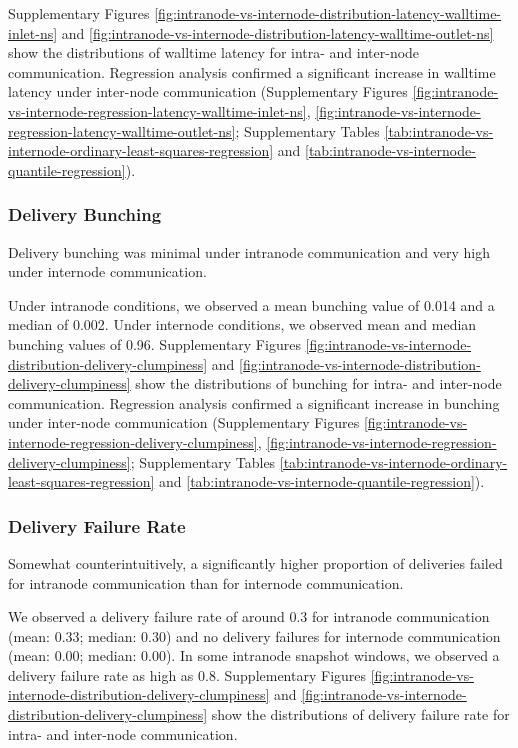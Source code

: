 Supplementary Figures \ref{fig:intranode-vs-internode-distribution-latency-walltime-inlet-ns} and \ref{fig:intranode-vs-internode-distribution-latency-walltime-outlet-ns} show the distributions of walltime latency for intra- and inter-node communication.
Regression analysis confirmed a significant increase in walltime latency under inter-node communication (Supplementary Figures \ref{fig:intranode-vs-internode-regression-latency-walltime-inlet-ns}, \ref{fig:intranode-vs-internode-regression-latency-walltime-outlet-ns}; Supplementary Tables \ref{tab:intranode-vs-internode-ordinary-least-squares-regression} and \ref{tab:intranode-vs-internode-quantile-regression}).

\subsubsection{Delivery Bunching}

Delivery bunching was minimal under intranode communication and very high under internode communication.

Under intranode conditions, we observed a mean bunching value of 0.014 and a median of 0.002.
Under internode conditions, we observed mean and median bunching values of 0.96.
Supplementary Figures \ref{fig:intranode-vs-internode-distribution-delivery-clumpiness} and \ref{fig:intranode-vs-internode-distribution-delivery-clumpiness} show the distributions of bunching for intra- and inter-node communication.
Regression analysis confirmed a significant increase in bunching under inter-node communication (Supplementary Figures \ref{fig:intranode-vs-internode-regression-delivery-clumpiness}, \ref{fig:intranode-vs-internode-regression-delivery-clumpiness}; Supplementary Tables \ref{tab:intranode-vs-internode-ordinary-least-squares-regression} and \ref{tab:intranode-vs-internode-quantile-regression}).

\subsubsection{Delivery Failure Rate}

Somewhat counterintuitively, a significantly higher proportion of deliveries failed for intranode communication than for internode communication.

We observed a delivery failure rate of around 0.3 for intranode communication (mean: 0.33; median: 0.30) and no delivery failures for internode communication (mean: 0.00; median: 0.00).
In some intranode snapshot windows, we observed a delivery failure rate as high as 0.8.
Supplementary Figures \ref{fig:intranode-vs-internode-distribution-delivery-clumpiness} and \ref{fig:intranode-vs-internode-distribution-delivery-clumpiness} show the distributions of delivery failure rate for intra- and inter-node communication.

